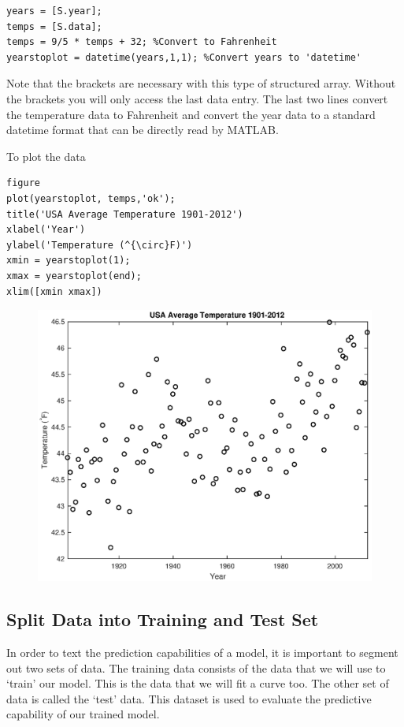 \documentclass[12pt]{article}
\begin{document}
\begin{lstlisting}[frame=single]
years = [S.year];
temps = [S.data];
temps = 9/5 * temps + 32; %Convert to Fahrenheit
yearstoplot = datetime(years,1,1); %Convert years to 'datetime'
\end{lstlisting}

Note that the brackets are necessary with this type of structured array. Without the brackets you will only access the last data entry. The last two lines convert the temperature data to Fahrenheit and convert the year data to a standard datetime format that can be directly read by MATLAB.

To plot the data

\begin{lstlisting}[frame=single]
%Plot data 
figure
plot(yearstoplot, temps,'ok');
title('USA Average Temperature 1901-2012')
xlabel('Year')
ylabel('Temperature (^{\circ}F)')
xmin = yearstoplot(1);
xmax = yearstoplot(end);
xlim([xmin xmax])

\end{lstlisting}

\begin{figure}[H]
\centering
\includegraphics[width=0.75\linewidth]{tempVsYearAll.eps}
\end{figure}

\subsection{Split Data into Training and Test Set}
In order to text the prediction capabilities of a model, it is important to segment out two sets of data. The training data consists of the data that we will use to `train' our model. This is the data that we will fit a curve too. The other set of data is called the `test' data. This dataset is used to evaluate the predictive capability of our trained model. 
\end{document}
